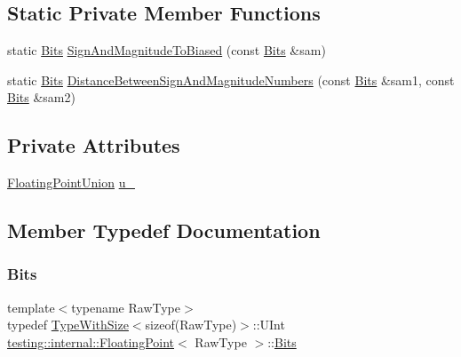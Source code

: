 \subsection*{Static Private Member Functions}
\begin{DoxyCompactItemize}
\item 
static \hyperlink{classtesting_1_1internal_1_1FloatingPoint_abf228bf6cd48f12c8b44c85b4971a731}{Bits} \hyperlink{classtesting_1_1internal_1_1FloatingPoint_a2cf0e39c6ebf026bc0353100d031ca85}{Sign\+And\+Magnitude\+To\+Biased} (const \hyperlink{classtesting_1_1internal_1_1FloatingPoint_abf228bf6cd48f12c8b44c85b4971a731}{Bits} \&sam)
\item 
static \hyperlink{classtesting_1_1internal_1_1FloatingPoint_abf228bf6cd48f12c8b44c85b4971a731}{Bits} \hyperlink{classtesting_1_1internal_1_1FloatingPoint_afe00f9f26ad2929a061f7e07b8a5071a}{Distance\+Between\+Sign\+And\+Magnitude\+Numbers} (const \hyperlink{classtesting_1_1internal_1_1FloatingPoint_abf228bf6cd48f12c8b44c85b4971a731}{Bits} \&sam1, const \hyperlink{classtesting_1_1internal_1_1FloatingPoint_abf228bf6cd48f12c8b44c85b4971a731}{Bits} \&sam2)
\end{DoxyCompactItemize}
\subsection*{Private Attributes}
\begin{DoxyCompactItemize}
\item 
\hyperlink{uniontesting_1_1internal_1_1FloatingPoint_1_1FloatingPointUnion}{Floating\+Point\+Union} \hyperlink{classtesting_1_1internal_1_1FloatingPoint_a2e0b6bd427248b91476f3fca281f7104}{u\+\_\+}
\end{DoxyCompactItemize}


\subsection{Member Typedef Documentation}
\mbox{\label{classtesting_1_1internal_1_1FloatingPoint_abf228bf6cd48f12c8b44c85b4971a731}} 
\subsubsection{\texorpdfstring{Bits}{Bits}}
{\footnotesize\ttfamily template$<$typename Raw\+Type$>$ \\
typedef \hyperlink{classtesting_1_1internal_1_1TypeWithSize}{Type\+With\+Size}$<$sizeof(Raw\+Type)$>$\+::U\+Int \hyperlink{classtesting_1_1internal_1_1FloatingPoint}{testing\+::internal\+::\+Floating\+Point}$<$ Raw\+Type $>$\+::\hyperlink{classtesting_1_1internal_1_1FloatingPoint_abf228bf6cd48f12c8b44c85b4971a731}{Bits}}



